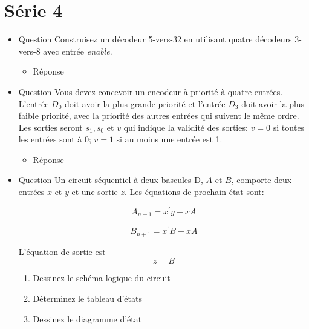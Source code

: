 \documentclass[letter, oneside]{book}
\begin{document}
\section*{Série 4}
\label{sec:orgd2d1509}
\begin{itemize}
\item Question
\label{sec:org473c024}
Construisez un décodeur 5-vers-32 en utilisant quatre décodeurs
3-vers-8 avec entrée \emph{enable}.

\begin{itemize}
\item Réponse
\label{sec:orge4e8337}
\begin{center}

\end{center}
\end{itemize}

\item Question
\label{sec:org4cfca5d}
Vous devez concevoir un encodeur à priorité à quatre
entrées. L'entrée \(D_0\) doit avoir la plus grande priorité et
l'entrée \(D_3\) doit avoir la plus faible priorité, avec la
priorité des autres entrées qui suivent le même ordre. Les sorties
seront \(s_1, s_0\) et \(v\) qui indique la validité des sorties:
\(v=0\) si toutes les entrées sont à 0; \(v=1\) si au moins une
entrée est 1.

\begin{itemize}
\item Réponse
\label{sec:orgd7c961f}
\begin{center}

\end{center}
\end{itemize}

\item Question
\label{sec:org9b2aa0b}
Un circuit séquentiel à deux bascules D, \(A\) et \(B\), comporte
deux entrées \(x\) et \(y\) et une sortie \(z\). Les équations de
prochain état sont:

$$A_{n+1} = x^{\prime} y + x A$$

$$B_{n+1} = x^{\prime} B + x A$$

L'équation de sortie est $$z=B$$

\begin{enumerate}
\item Dessinez le schéma logique du circuit

\item Déterminez le tableau d'états

\item Dessinez le diagramme d'état
\end{enumerate}


\end{itemize}
\end{document}
